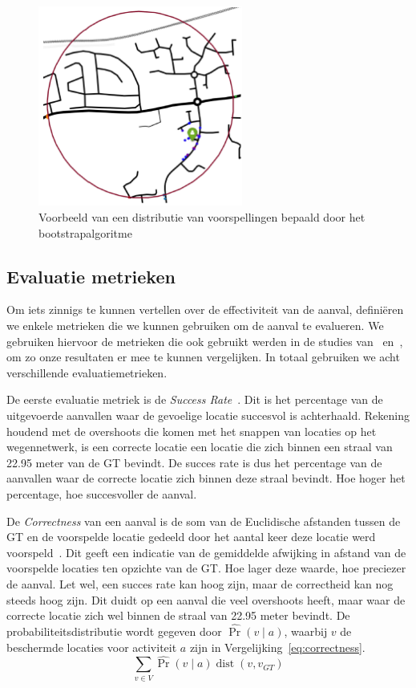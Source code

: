 \begin{figure}[h]
    \centering
    \includegraphics[width=0.6\textwidth]{fig/bootstrapping.png}
    \caption{Voorbeeld van een distributie van voorspellingen bepaald door het bootstrapalgoritme~\cite{Verdonck_2022}}\label{fig:bootstrapping}
\end{figure}

\subsection{Evaluatie metrieken}
Om iets zinnigs te kunnen vertellen over de effectiviteit van de aanval,
definiëren we enkele metrieken die we kunnen gebruiken om de aanval te
evalueren. We gebruiken hiervoor de metrieken die ook gebruikt werden in de
studies van~\citeauthor{Dhondt} en~\citeauthor{Verdonck_2022}, om zo onze
resultaten er mee te kunnen vergelijken. In totaal gebruiken we acht
verschillende evaluatiemetrieken.

De eerste evaluatie metriek is de \textit{Success Rate}~\cite{Dhondt}. Dit is
het percentage van de uitgevoerde aanvallen waar de gevoelige locatie succesvol
is achterhaald. Rekening houdend met de overshoots die komen met het snappen
van locaties op het wegennetwerk, is een correcte locatie een locatie die zich
binnen een straal van 22.95 meter van de \ac{GT} bevindt. De succes rate is dus
het percentage van de aanvallen waar de correcte locatie zich binnen deze
straal bevindt. Hoe hoger het percentage, hoe succesvoller de aanval.

De \textit{Correctness} van een aanval is de som van de Euclidische afstanden
tussen de \ac{GT} en de voorspelde locatie gedeeld door het aantal keer deze
locatie werd voorspeld~\cite{Dhondt, Verdonck_2022}. Dit geeft een indicatie
van de gemiddelde afwijking in afstand van de voorspelde locaties ten opzichte
van de \ac{GT}. Hoe lager deze waarde, hoe preciezer de aanval. Let wel, een
succes rate kan hoog zijn, maar de correctheid kan nog steeds hoog zijn. Dit
duidt op een aanval die veel overshoots heeft, maar waar de correcte locatie
zich wel binnen de straal van 22.95 meter bevindt. De probabiliteitsdistributie
wordt gegeven door $\widehat{\operatorname{Pr}}(v \mid a)$, waarbij $v$ de
beschermde locaties voor activiteit $a$ zijn in
Vergelijking~\ref{eq:correctness}.
\begin{equation}
    \sum_{v \in V} \widehat{\operatorname{Pr}}(v \mid a) \operatorname{dist}\left(v, v_{G T}\right)\label{eq:correctness}
\end{equation}

